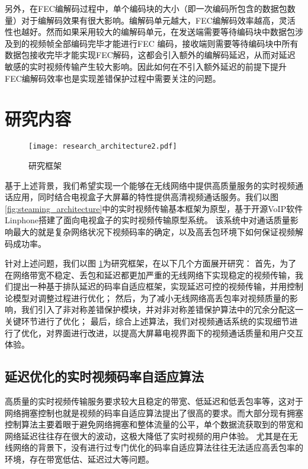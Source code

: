 另外，在FEC编解码过程中，单个编码块的大小（即一次编码所包含的数据包数量）对于编解码效果有很大影响。编解码单元越大，FEC编解码效率越高，灵活性也越好。然而如果采用较大的编解码单元，在发送端需要等待编码块中数据包涉及到的视频帧全部编码完毕才能进行FEC 编码，接收端则需要等待编码块中所有数据包接收完毕才能实现FEC解码，这都会引入额外的编解码延迟，从而对延迟敏感的实时视频传输产生较大影响。因此如何在不引入额外延迟的前提下提升FEC编解码效率也是实现差错保护过程中需要关注的问题。

\section{研究内容}
\begin{figure}[htbp]
  \centering
  \texttt{[image: research\_architecture2.pdf]}
  \caption{研究框架}
  \label{fig:research_architecture}
\end{figure}

基于上述背景，我们希望实现一个能够在无线网络中提供高质量服务的实时视频通话应用，同时结合电视盒子大屏幕的特性提供高清视频通话服务。我们以图 \ref{fig:steaming_architecture}中的实时视频传输基本框架为原型，基于开源VoIP软件Linphone搭建了面向电视盒子的实时视频传输原型系统。
该系统中对通话质量影响最大的就是复杂网络状况下视频码率的确定，以及高丢包环境下如何保证视频解码成功率。

针对上述问题，我们以图 \ref{fig:research_architecture}为研究框架，在以下几个方面展开研究：
首先，为了在网络带宽不稳定、丢包和延迟都更加严重的无线网络下实现稳定的视频传输，我们提出一种基于排队延迟的码率自适应框架，实现延迟可控的视频传输，并用控制论模型对调整过程进行优化；
然后，为了减小无线网络高丢包率对视频质量的影响，我们引入了非对称差错保护模块，并对非对称差错保护算法中的冗余分配这一关键环节进行了优化；
最后，综合上述算法，我们对视频通话系统的实现细节进行了优化，对界面进行改进，以提高大屏幕电视界面下的视频通话质量和用户交互体验。

\subsection{延迟优化的实时视频码率自适应算法}
高质量的实时视频传输服务要求较大且稳定的带宽、低延迟和低丢包率等，这对于网络拥塞控制也就是视频的码率自适应算法提出了很高的要求。而大部分现有拥塞控制算法主要着眼于避免网络拥塞和整体流量的公平，单个数据流获取到的带宽和网络延迟往往存在很大的波动，这极大降低了实时视频的用户体验。
尤其是在无线网络的背景下，没有进行过专门优化的码率自适应算法往往无法适应高丢包率的环境，存在带宽低估、延迟过大等问题。

